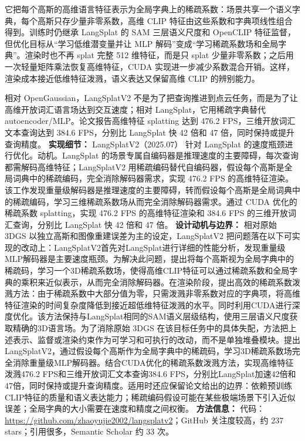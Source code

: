 它把每个高斯的高维语言特征表示为全局字典上的稀疏系数：场景共享一个语义字典，每个高斯只存少量非零系数，高维 CLIP 特征由这些系数和字典项线性组合得到。训练时仍继承 LangSplat 的 SAM 三层语义尺度和 OpenCLIP 特征监督，但优化目标从“学习低维潜变量并让 MLP 解码”变成“学习稀疏系数场和全局字典”。渲染时也不再 splat 完整 512 维特征，而是只 splat 少量非零系数；之后用一次轻量矩阵乘法恢复高维特征，CUDA 实现进一步减少系数混合开销。这样，渲染成本接近低维特征泼溅，语义表达又保留高维 CLIP 的辨别能力。

相对 OpenGaussian，LangSplatV2 不是为了把查询推进到点云任务，而是为了让高维开放词汇语言场达到交互速度；相对 LangSplat，它用稀疏字典替代 autoencoder/MLP。论文报告高维特征 splatting 达到 476.2 FPS，三维开放词汇文本查询达到 384.6 FPS，分别比 LangSplat 快 42 倍和 47 倍，同时保持或提升查询精度。
\textbf{实现细节：} LangSplatV2（2025.07） 针对 LangSplat 的速度瓶颈进行优化。动机。LangSplat 的场景专属自编码器是推理速度的主要障碍，每次查询都需解码高维特征；LangSplatV2 用稀疏编码替代自编码器，假设每个高斯是全局词典中的稀疏编码，完全消除解码器需求，实现 476.2 FPS 的高维特征渲染。该工作发现重量级解码器是推理速度的主要障碍，转而假设每个高斯是全局词典中的稀疏编码，学习三维稀疏系数场从而完全消除解码器需求。通过 CUDA 优化的稀疏系数 splatting，实现 476.2 FPS 的高维特征渲染和 384.6 FPS 的三维开放词汇查询，分别比 LangSplat 快 42 倍和 47 倍。
\textbf{设计动机与边界：} 相对原始 3DGS 以独立高斯和图像重建误差为主的设定，LangSplatV2 把问题落在以下可实现的改动上：LangSplatV2首先对LangSplat进行详细的性能分析，发现重量级MLP解码器是主要速度瓶颈。为解决此问题，提出将每个高斯视为全局字典中的稀疏码，学习一个3D稀疏系数场，使得高维CLIP特征可以通过稀疏系数和全局字典的乘积来近似表示，从而完全消除解码器。在渲染阶段，提出高效的稀疏系数泼溅方法：由于稀疏系数中大部分值为零，只需泼溅非零系数对应的字典项，将高维特征渲染的时间复杂度降低到接近超低维特征泼溅的水平。同时利用CUDA进行深度优化。该方法保持与LangSplat相同的SAM语义层级结构，使用三层语义尺度获取精确的3D语言场。为了消除原始 3DGS 在该目标任务中的具体失配，方法把上述表示、监督或渲染约束作为可学习和可执行的改动，而不是单独堆叠模块。提出LangSplatV2，通过假设每个高斯作为全局字典中的稀疏码，学习3D稀疏系数场完全消除重量级MLP解码器。结合CUDA优化的稀疏系数泼溅方法，实现高维特征泼溅476.2 FPS和三维开放词汇文本查询384.6 FPS，分别比LangSplat加速42倍和47倍，同时保持或提升查询精度。适用时还应保留论文给出的边界：依赖预训练CLIP特征的质量和语义表达能力；稀疏编码假设可能在某些极端场景下引入近似误差；全局字典的大小需要在速度和精度之间权衡。
\textbf{方法信息：} 代码：\url{https://github.com/zhaoyujie2002/langsplatv2}；GitHub 关注度较高，约 237 stars；引用很多，Semantic Scholar 约 33 次。



